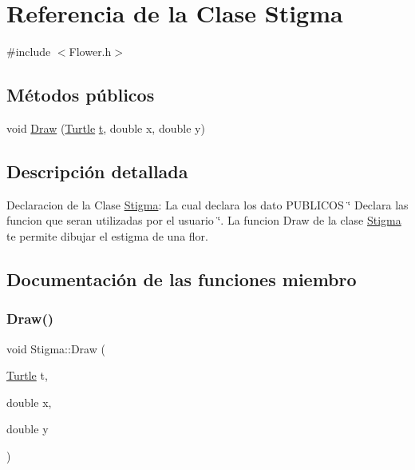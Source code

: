 \hypertarget{class_stigma}{}\section{Referencia de la Clase Stigma}
\label{class_stigma}


{\ttfamily \#include $<$Flower.\+h$>$}

\subsection*{Métodos públicos}
\begin{DoxyCompactItemize}
\item 
void \mbox{\hyperlink{class_stigma_a625b81002277e4d7f5cf9d5c5251b658}{Draw}} (\mbox{\hyperlink{class_turtle}{Turtle}} \mbox{\hyperlink{_abstract_8cpp_a87833ae07d42f160626b6355cd9f8cf0}{t}}, double x, double y)
\end{DoxyCompactItemize}


\subsection{Descripción detallada}
Declaracion de la Clase \mbox{\hyperlink{class_stigma}{Stigma}}\+: La cual declara los dato P\+U\+B\+L\+I\+C\+OS \char`\"{} Declara las funcion que seran utilizadas por el usuario \char`\"{}. La funcion Draw de la clase \mbox{\hyperlink{class_stigma}{Stigma}} te permite dibujar el estigma de una flor. 

\subsection{Documentación de las funciones miembro}
\mbox{\label{class_stigma_a625b81002277e4d7f5cf9d5c5251b658}} 
\subsubsection{\texorpdfstring{Draw()}{Draw()}}
{\footnotesize\ttfamily void Stigma\+::\+Draw (\begin{DoxyParamCaption}\item[{\mbox{\hyperlink{class_turtle}{Turtle}}}]{t,  }\item[{double}]{x,  }\item[{double}]{y }\end{DoxyParamCaption})\hspace{0.3cm}{\ttfamily [inline]}}


